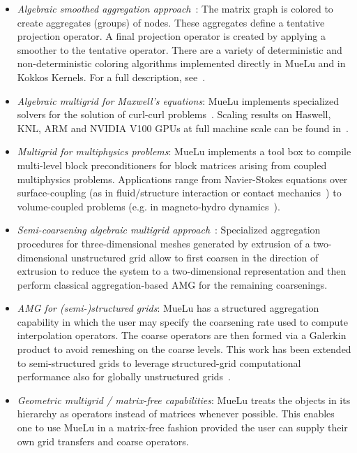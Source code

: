 \begin{itemize}
\item \emph{Algebraic smoothed aggregation approach}~\cite{Vanek1996a}:
The matrix graph is colored to create aggregates (groups) of nodes.
These aggregates define a tentative projection operator.
A final projection operator is created by applying a smoother to the tentative operator.
There are a variety of deterministic and non-deterministic coloring algorithms implemented directly
in MueLu and in Kokkos Kernels.  For a full description, see~\cite{BergerVergiat2023a}.

\item \emph{Algebraic multigrid for Maxwell's equations}:
  MueLu implements specialized solvers for the solution of curl-curl problems~\cite{BochevHuEtAl2008_AlgebraicMultigridApproachBased}.
  Scaling results on Haswell, KNL, ARM and NVIDIA V100 GPUs at full machine scale can be found in~\cite{BettencourtBrownEtAl2021_EmpirePic}.

\item \emph{Multigrid for multiphysics problems}:
MueLu implements a tool box to compile multi-level block preconditioners for block matrices arising from coupled multiphysics problems.
Applications range from Navier-Stokes equations
over surface-coupling (as in fluid/structure interaction or contact mechanics~\cite{Wiesner2021a})
to volume-coupled problems (e.g. in magneto-hydro dynamics~\cite{Ohm2022a}).

\item \emph{Semi-coarsening algebraic multigrid approach}~\cite{Tuminaro2016a}:
Specialized aggregation procedures for three-dimensional meshes generated by extrusion of a two-dimensional unstructured grid
allow to first coarsen in the direction of extrusion to reduce the system to a two-dimensional representation and then perform classical aggregation-based AMG
for the remaining coarsenings.

\item \emph{AMG for (semi-)structured grids}:
MueLu has a structured aggregation capability in which the user may specify the coarsening rate used to compute interpolation operators.
The coarse operators are then formed via a Galerkin product to avoid remeshing on the coarse levels.
This work has been extended to semi-structured grids to leverage structured-grid computational performance also for globally unstructured grids~\cite{Mayr2022a}.

\item \emph{Geometric multigrid / matrix-free capabilities}:
MueLu treats the objects in its hierarchy as operators instead of matrices whenever possible.
This enables one to use MueLu in a matrix-free fashion provided the user can supply their own grid transfers and coarse operators.

\end{itemize}

